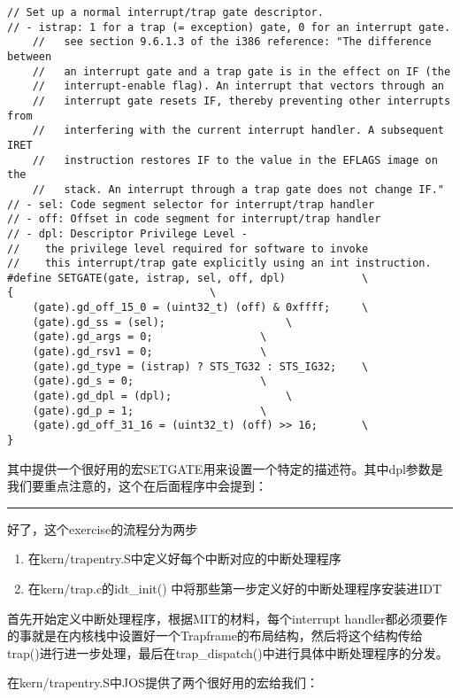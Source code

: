 \documentclass{article}
\newcommand{\funcname}[1]{{\ttfamily \small #1}}
\begin{document}
\begin{CJK*}{UTF8}{gkai}
\begin{lstlisting}[style=ccode, firstnumber=257, title={\scriptsize \ttfamily \bfseries inc/mmu.h}]
// Set up a normal interrupt/trap gate descriptor.
// - istrap: 1 for a trap (= exception) gate, 0 for an interrupt gate.
    //   see section 9.6.1.3 of the i386 reference: "The difference between
    //   an interrupt gate and a trap gate is in the effect on IF (the
    //   interrupt-enable flag). An interrupt that vectors through an
    //   interrupt gate resets IF, thereby preventing other interrupts from
    //   interfering with the current interrupt handler. A subsequent IRET
    //   instruction restores IF to the value in the EFLAGS image on the
    //   stack. An interrupt through a trap gate does not change IF."
// - sel: Code segment selector for interrupt/trap handler
// - off: Offset in code segment for interrupt/trap handler
// - dpl: Descriptor Privilege Level -
//	  the privilege level required for software to invoke
//	  this interrupt/trap gate explicitly using an int instruction.
#define SETGATE(gate, istrap, sel, off, dpl)			\
{								\
	(gate).gd_off_15_0 = (uint32_t) (off) & 0xffff;		\
	(gate).gd_ss = (sel);					\
	(gate).gd_args = 0;					\
	(gate).gd_rsv1 = 0;					\
	(gate).gd_type = (istrap) ? STS_TG32 : STS_IG32;	\
	(gate).gd_s = 0;					\
	(gate).gd_dpl = (dpl);					\
	(gate).gd_p = 1;					\
	(gate).gd_off_31_16 = (uint32_t) (off) >> 16;		\
}
\end{lstlisting}

其中提供一个很好用的宏SETGATE用来设置一个特定的描述符。其中dpl参数是我们要重点注意的，这个在后面程序中会提到：

\vspace{3em}

\hrule

\vspace{3em}

好了，这个exercise的流程分为两步

\begin{enumerate}
\item{在kern/trapentry.S中定义好每个中断对应的中断处理程序}
\item{在kern/trap.c的\funcname{idt\_init()} 中将那些第一步定义好的中断处理程序安装进IDT}
\end{enumerate}


首先开始定义中断处理程序，根据MIT的材料，每个interrupt handler都必须要作的事就是在内核栈中设置好一个Trapframe的布局结构，然后将这个结构传给\funcname{trap()}进行进一步处理，最后在\funcname{trap\_dispatch()}中进行具体中断处理程序的分发。

在kern/trapentry.S中JOS提供了两个很好用的宏给我们：



\end{CJK*}
\end{document}
